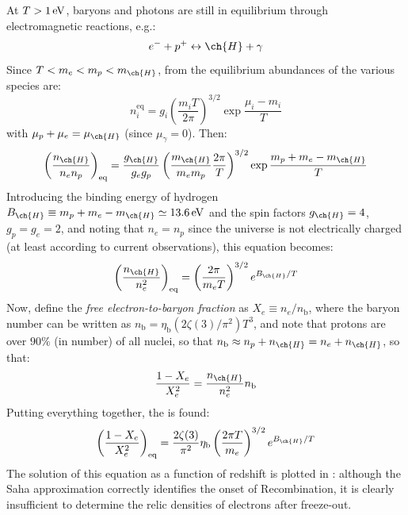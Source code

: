 At $ T > 1 \,\mathrm{eV} $, baryons and photons are still in equilibrium through electromagnetic reactions, e.g.:
\begin{equation*}
  e^- + p^+ \lra \ch{H} + \gamma
\end{equation*}
Since $ T < m_e < m_p < m_{\ch{H}} $, from  the equilibrium abundances of the various species are:
\begin{equation}
  n_i^\text{eq} = g_i \left( \frac{m_i T}{2\pi} \right)^{3/2} \exp \frac{\mu_i - m_i}{T}
\end{equation}
with $ \mu_p + \mu_e = \mu_{\ch{H}} $ (since $ \mu_\gamma = 0 $). Then:
\begin{equation*}
  \left( \frac{n_{\ch{H}}}{n_e n_p} \right)_\text{eq} = \frac{g_{\ch{H}}}{g_e g_p} \left( \frac{m_{\ch{H}}}{m_e m_p} \frac{2\pi}{T} \right)^{3/2} \exp \frac{m_p + m_e - m_{\ch{H}}}{T}
\end{equation*}
Introducing the binding energy of hydrogen $ B_{\ch{H}} \equiv m_p + m_e - m_{\ch{H}} \simeq 13.6 \ev $ and the spin factors $ g_{\ch{H}} = 4 $, $ g_p = g_e = 2 $, and noting that $ n_e = n_p $ since the universe is not electrically charged (at least according to current observations), this equation becomes:
\begin{equation*}
  \left( \frac{n_{\ch{H}}}{n_e^2} \right)_\text{eq} = \left( \frac{2\pi}{m_e T} \right)^{3/2} e^{B_{\ch{H}} / T}
\end{equation*}
Now, define the \emph{free electron-to-baryon fraction} as $ X_e \equiv n_e / n_\text{b} $, where the baryon number can be written as $ n_\text{b} = \eta_\text{b} (2\zeta(3)/\pi^2) T^3 $, and note that protons are over $ 90\% $ (in number) of all nuclei, so that $ n_\text{b} \approx n_p + n_{\ch{H}} = n_e + n_{\ch{H}} $, so that:
\begin{equation}
  \frac{1 - X_e}{X_e^2} = \frac{n_{\ch{H}}}{n_e^2} n_\text{b}
\end{equation}
Putting everything together, the  is found:
\begin{equation}
  \left( \frac{1 - X_e}{X_e^2} \right)_\text{eq} = \frac{2 \zeta(3)}{\pi^2} \eta_\text{b} \left( \frac{2\pi T}{m_e} \right)^{3/2} e^{B_{\ch{H}} / T}
\end{equation}
The solution of this equation as a function of redshift is plotted in : although the Saha approximation correctly identifies the onset of Recombination, it is clearly insufficient to determine the relic densities of electrons after freeze-out.

